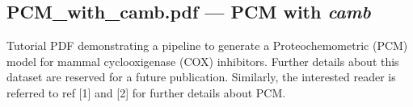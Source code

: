 \documentclass{bmcart}
\begin{document}
\begin{backmatter}
  \subsection*{PCM\_with\_camb.pdf --- PCM with \textit{camb}}
    Tutorial PDF demonstrating a pipeline to generate a Proteochemometric (PCM) model for mammal cyclooxigenase (COX) inhibitors. Further details about this dataset are reserved for a future publication. Similarly, the interested reader is referred to ref [1] and [2] for further details about PCM.

\end{backmatter}
\end{document}
